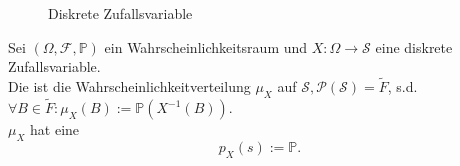 \begin{figure}[ht]
    \centering
    \caption{Diskrete Zufallsvariable}
    \label{fig:diskrete-zufallsvariable}
\end{figure}
\begin{definition}
    Sei $(\Omega, \mathcal{F}, \mathbb{P})$ ein Wahrscheinlichkeitsraum  und $X : \Omega\to \mathcal{S}$ eine diskrete Zufallsvariable. \\
    Die  ist die Wahrscheinlichkeitverteilung $\mu_X$ auf  $\mathcal{S}, \mathcal{P}(\mathcal{S}) = \tilde{F}$, s.d. $\forall B\in \tilde{F}: \mu_X(B) := \mathbb{P}(X^{-1}(B))$. \\
    $\mu_X$ hat eine 
     \[
         p_{X}(s) := \mathbb{P}
    .\] 
\end{definition}
